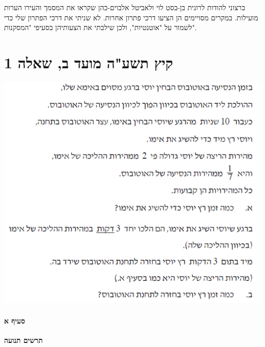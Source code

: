 \documentclass[12pt,a4paper]{article}
\begin{document}
ברצוני להודות לרונית בן-בסט לוי ולאביטל אלבוים-כהן שקראו את המסמך והעירו הערות מועילות. במקרים מסויימים הן הציעו דרכי פתרון אחרות. לא שניתי את דרכי הפתרון שלי כדי לשמור על "אוטנטיות", ולכן שילבתי את הצעותיהן בסעיפי "המסקנות".

\newpage


\section*{קיץ תשע"ה מועד ב, שאלה 1}

\begin{center}
\includegraphics[width=.8\textwidth]{summer-2015b-1}
\end{center}

\vspace{-4ex}\paragraph{סעיף א}
\mbox{}

\textbf{תרשים תנועה}
\begin{center}
\end{center}
\end{document}
